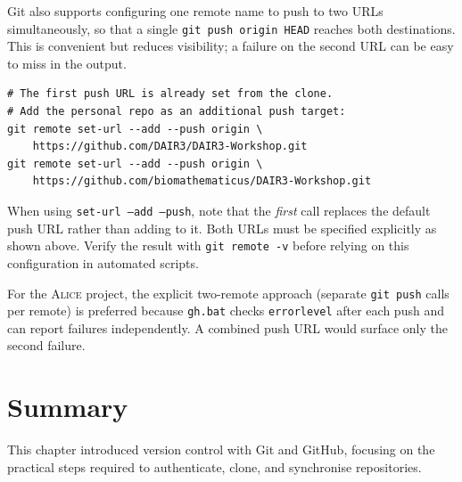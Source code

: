Git also supports configuring one remote name to push to two URLs
simultaneously, so that a single \texttt{git push origin HEAD} reaches
both destinations. This is convenient but reduces visibility; a failure
on the second URL can be easy to miss in the output.

\begin{lstlisting}[style=bashstyle, caption={Add a second push URL to the origin remote}]
# The first push URL is already set from the clone.
# Add the personal repo as an additional push target:
git remote set-url --add --push origin \
    https://github.com/DAIR3/DAIR3-Workshop.git
git remote set-url --add --push origin \
    https://github.com/biomathematicus/DAIR3-Workshop.git
\end{lstlisting}

\begin{warningbox}
When using \texttt{set-url --add --push}, note that the \emph{first}
call replaces the default push URL rather than adding to it. Both URLs
must be specified explicitly as shown above. Verify the result with
\texttt{git remote -v} before relying on this configuration in
automated scripts.
\end{warningbox}

For the \textsc{Alice} project, the explicit two-remote approach
(separate \texttt{git push} calls per remote) is preferred because
\texttt{gh.bat} checks \texttt{errorlevel} after each push and can
report failures independently. A combined push URL would surface only
the second failure.

\section{Summary}
\label{sec:git-summary}

This chapter introduced version control with Git and GitHub, focusing on
the practical steps required to authenticate, clone, and synchronise
repositories.

